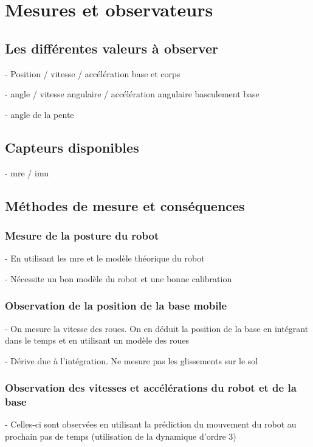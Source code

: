 \chapter{Mesures et observateurs}
	\section{Les différentes valeurs à observer}

		- Position / vitesse / accélération base et corps

		- angle / vitesse angulaire / accélération angulaire basculement base

		- angle de la pente

	\section{Capteurs disponibles}

		- mre / imu

	\section{Méthodes de mesure et conséquences}
		\subsection{Mesure de la posture du robot}

			- En utilisant les mre et le modèle théorique du robot
			
			- Nécessite un bon modèle du robot et une bonne calibration

		\subsection{Observation de la position de la base mobile}

			- On mesure la vitesse des roues. On en déduit la position de la base en intégrant dans le temps et en utilisant un modèle des roues

			- Dérive due à l'intégration. Ne mesure pas les glissements sur le sol

		\subsection{Observation des vitesses et accélérations du robot et de la base}

			- Celles-ci sont observées en utilisant la prédiction du mouvement du robot au prochain pas de temps (utilisation de la dynamique d'ordre 3)

